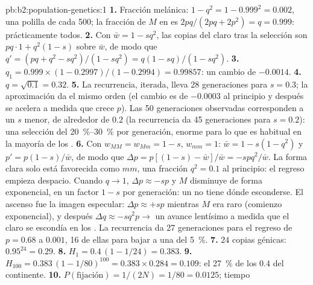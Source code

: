 \begin{solution}{pb:b2:population-genetics:1}
\textbf{1.} Fracción melánica: $1 - q^{2} = 1 - 0.999^{2} = 0.002$,
una polilla de cada 500; la fracción de  $M$ en  es
$2pq/(2pq + 2p^{2}) = q = 0.999$: prácticamente todos.
\textbf{2.} Con $\bar w = 1 - sq^{2}$, las copias del  claro tras la
selección son $pq\cdot 1 + q^{2}(1 - s)$ sobre $\bar w$, de modo que $q'
= (pq + q^{2} - sq^{2})/(1 - sq^{2}) = q(1 - sq)/(1 - sq^{2})$.
\textbf{3.} $q_1 = 0.999\times(1 - 0.2997)/(1 - 0.2994) = 0.99857$:
un cambio de $-0.0014$.
\textbf{4.} $q = \sqrt{0.1} = 0.32$.
\textbf{5.} La recurrencia, iterada, lleva 28 generaciones para $s =
0.3$; la aproximación da el mismo orden (el cambio es de
$-0.0003$ al principio y después se acelera a medida que crece $p$). Las
50 generaciones observadas corresponden a un $s$ menor, de alrededor de
$0.2$ (la recurrencia da 45 generaciones para $s = 0.2$): una selección
del \qtyrange{20}{30}{\%} por generación, enorme para lo que es habitual en
la mayoría de los .
\textbf{6.} Con $w_{MM} = w_{Mm} = 1 - s$, $w_{mm} = 1$: $\bar w = 1
- s(1 - q^{2})$ y $p' = p(1 - s)/\bar w$, de modo que $\Delta p = p[(1 - s) -
\bar w]/\bar w = -spq^{2}/\bar w$. La forma clara solo está favorecida
como  $mm$, una fracción $q^{2} = 0.1$ al principio: el regreso
empieza despacio. Cuando $q \to 1$, $\Delta p \approx -sp$ y $M$
disminuye de forma exponencial, en un factor $1 - s$ por generación: un
  no tiene dónde esconderse. El ascenso fue la imagen
especular:
$\Delta p \approx +sp$ mientras $M$ era raro (comienzo exponencial), y
después
$\Delta q \approx -sq^{2}p \to$ un avance lentísimo a medida que el 
claro se escondía en los . La recurrencia da 27 generaciones
para el regreso de $p = 0.68$ a $0.001$, 16 de ellas para bajar a una
 del \qty{5}{\%}.
\textbf{7.} $24$ copias génicas: $0.95^{24} = 0.29$.
\textbf{8.} $H_1 = 0.4\,(1 - 1/24) = 0.383$.
\textbf{9.} $H_{100} = 0.383\,(1 - 1/80)^{100} = 0.383\times 0.284 =
0.109$: el \qty{27}{\%} de los $0.4$ del continente.
\textbf{10.} $P(\text{fijación}) = 1/(2N) = 1/80 = 0.0125$; tiempo

\end{solution}
